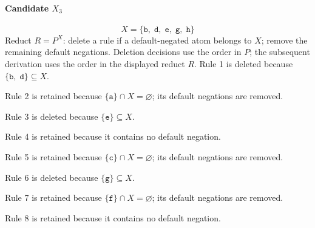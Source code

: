 \documentclass[a4paper,11pt]{article}
\newcommand{\at}[1]{\texttt{#1}}
\begin{document}
\paragraph{Candidate $X_3$}
\[
X=\{\at{b},\;\at{d},\;\at{e},\;\at{g},\;\at{h}\}
\]
Reduct $R=P^X$: delete a rule if a default-negated atom belongs to $X$; remove the remaining default negations. Deletion decisions use the order in $P$; the subsequent derivation uses the order in the displayed reduct $R$.
Rule 1 is deleted because $\{\at{b},\;\at{d}\}\subseteq X$.

Rule 2 is retained because $\{\at{a}\}\cap X=\varnothing$; its default negations are removed.

Rule 3 is deleted because $\{\at{e}\}\subseteq X$.

Rule 4 is retained because it contains no default negation.

Rule 5 is retained because $\{\at{c}\}\cap X=\varnothing$; its default negations are removed.

Rule 6 is deleted because $\{\at{g}\}\subseteq X$.

Rule 7 is retained because $\{\at{f}\}\cap X=\varnothing$; its default negations are removed.

Rule 8 is retained because it contains no default negation.
\end{document}
